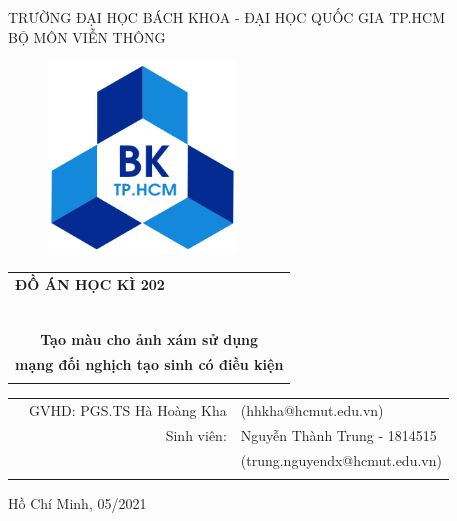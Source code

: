 \documentclass[a4paper, 12pt]{article}
\begin{document}
\begin{titlepage}

\begin{center}
TRƯỜNG ĐẠI HỌC BÁCH KHOA - ĐẠI HỌC QUỐC GIA TP.HCM\\
BỘ MÔN VIỄN THÔNG
\end{center}

\vspace{1cm}

\begin{figure}[!h]
\begin{center}
\includegraphics[width=5cm]{hcmut.png}
\end{center}
\end{figure}

\vspace{1cm}


\begin{center}
\begin{tabular}{c}
\multicolumn{1}{l}{\textbf{{\Large ĐỒ ÁN HỌC KÌ 202}}}\\
~~\\
\hline
\\
\textbf{\Huge Tạo màu cho ảnh xám sử dụng}\\
\textbf{\Huge mạng đối nghịch tạo sinh có điều kiện}\\
\\
\hline
\end{tabular}
\end{center}

\vspace{3cm}

\begin{table}[h]
\begin{tabular}{rrl}

\hspace{2.7 cm} & GVHD: PGS.TS Hà Hoàng Kha & (hhkha@hcmut.edu.vn)\\
& Sinh viên: & Nguyễn Thành Trung - 1814515\\
& & (trung.nguyendx@hcmut.edu.vn)\\
\vspace{30pt}\\

\end{tabular}
\end{table}

\begin{center}
{\footnotesize Hồ Chí Minh, 05/2021}
\end{center}
\end{titlepage}
\end{document}
